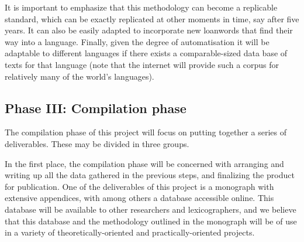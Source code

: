 \documentclass[a4paper]{article}
\begin{document}
It is important to emphasize that this methodology can become a replicable standard, which can be exactly replicated at other moments in time, say after five years. 
It can also be easily adapted to incorporate new loanwords that find their way into a language.
Finally, given the degree of automatisation it will be adaptable to different languages if there exists a comparable-sized data base of texts for that language (note that the internet will provide such a corpus for relatively many of the world's languages).



	



\subsection{Phase III: Compilation phase}

The compilation phase of this project will focus on putting together a series of deliverables. These may be divided in three groups.

In the first place, the compilation phase will be concerned with arranging and writing up all the data gathered in the previous steps, and finalizing the product for publication. One of the deliverables of this project is a monograph with extensive appendices, with among others a database accessible online. This database will be available to other researchers and lexicographers, and we believe that this database and the methodology outlined in the monograph will be of use in a variety of theoretically-oriented and practically-oriented projects.
\end{document}
